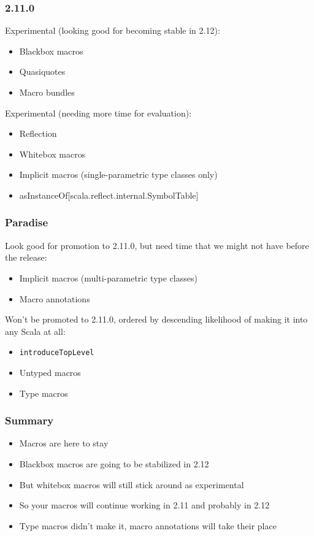 \documentclass[svgnames,hyperref={bookmarks=false}]{beamer}
\begin{document}
\begin{frame}[fragile]
\frametitle{2.11.0}

Experimental (looking good for becoming stable in 2.12):
\begin{itemize}
\item Blackbox macros
\item Quasiquotes
\item Macro bundles
\end{itemize}

\vskip20pt
Experimental (needing more time for evaluation):
\begin{itemize}
\item Reflection
\item Whitebox macros
\item Implicit macros (single-parametric type classes only)
\item asInstanceOf[scala.reflect.internal.SymbolTable]
\end{itemize}
\end{frame}

\begin{frame}[fragile]
\frametitle{Paradise}

Look good for promotion to 2.11.0, but need time that we might not have before the release:
\begin{itemize}
\item Implicit macros (multi-parametric type classes)
\item Macro annotations
\end{itemize}

\vskip20pt
Won't be promoted to 2.11.0, ordered by descending likelihood of making it into any Scala at all:
\begin{itemize}
\item \texttt{introduceTopLevel}
\item Untyped macros
\item Type macros
\end{itemize}
\end{frame}

\begin{frame}[fragile]
\frametitle{Summary}

\begin{itemize}
\item Macros are here to stay
\item Blackbox macros are going to be stabilized in 2.12
\item But whitebox macros will still stick around as experimental
\item So your macros will continue working in 2.11 and probably in 2.12
\item Type macros didn't make it, macro annotations will take their place
\end{itemize}
\end{frame}
\end{document}

